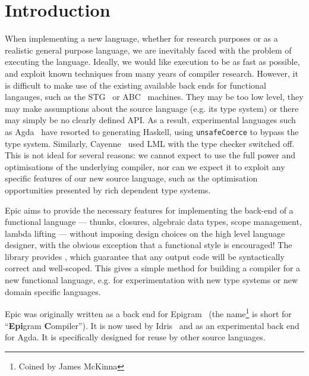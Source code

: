 \section{Introduction}

When implementing a new language, whether for research purposes or as
a realistic general purpose language, we are inevitably faced with the
problem of executing the language. Ideally, we would like execution to
be as fast as possible, and exploit known techniques from many years
of compiler research. However, it is difficult to make use of the
existing available back ends for functional langauges, such as the
STG~\cite{evalpush,stg,llvm-haskell} or ABC~\cite{abc-machine}
machines. They may be too low level, they may make assumptions about
the source language (e.g. its type system) or there may simply be no
clearly defined API. As a result, experimental languages such as
Agda~\cite{norell-thesis} have resorted to generating Haskell, using
\texttt{unsafeCoerce} to bypass the type system. Similarly,
Cayenne~\cite{cayenne-icfp} used LML with the type checker switched
off. This is not ideal for several reasons: we cannot expect to use
the full power and optimisations of the underlying compiler, nor can
we expect it to exploit any specific features of our new source
language, such as the optimisation opportunities presented by rich
dependent type systems.

Epic aims to provide the necessary features for implementing the
back-end of a functional language --- thunks, closures, algebraic data
types, scope management, lambda lifting --- without imposing
 design choices on the high level language designer, with
the obvious exception that a functional style is encouraged!  The
library provides , which guarantee that
any output code will be syntactically correct and well-scoped.  This
gives a simple method for building a compiler for a new functional
language, e.g. for experimentation with new type systems or new domain
specific languages.

Epic was originally written as a back end for
Epigram~\cite{levitation} (the name\footnote{Coined by James McKinna}
is short for ``\textbf{Epi}gram \textbf{C}ompiler''). It is now used
by Idris~\cite{plpv11} and as an experimental back end for
Agda. It is specifically designed for reuse by other source languages.



